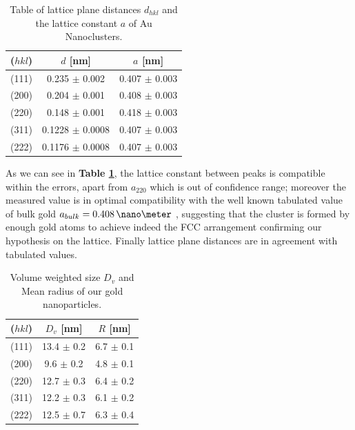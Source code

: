 \documentclass[twocolumn]{article}
\begin{document}
\begin{multicols}{2}
\begin{table}[H]
    \centering
    \begin{tabular}{c c c}
         ($hkl$) & {\bf $d$} [nm] & {\bf $a$} [nm] \\
        \hline
        \hline
         (111) & 0.235 $\pm$ 0.002 & 0.407 $\pm$ 0.003  \\
         (200) & 0.204 $\pm$ 0.001 & 0.408 $\pm$ 0.003  \\
         (220) & 0.148 $\pm$ 0.001 & 0.418 $\pm$ 0.003 \\
         (311) & 0.1228 $\pm$ 0.0008 & 0.407 $\pm$ 0.003 \\
         (222) & 0.1176 $\pm$ 0.0008 & 0.407 $\pm$ 0.003 \\
         \hline
    \end{tabular}
    \caption{Table of lattice plane distances $d_{hkl}$ and the lattice constant $a$ of Au Nanoclusters.}
    \label{tab:latticeconst}
\end{table}
As we can see in {\bf Table \ref{tab:latticeconst}}, the lattice constant between peaks is compatible within the errors, apart from $a_{220}$ which is out of confidence range; moreover the measured value is in optimal compatibility with the well known tabulated value of bulk gold $a_{bulk} = 0.408\, \nano\meter$ \cite{Kittel2004}, suggesting that the cluster is formed by enough gold atoms to achieve indeed the FCC arrangement confirming our hypothesis on the lattice.
Finally lattice plane distances are in agreement with tabulated values.

\begin{table}[H]
    \centering
    \begin{tabular}{c c c}
         ($hkl$) & {\bf $D_v$} [nm] & {\bf $R$} [nm] \\
        \hline
        \hline
         (111) & 13.4 $\pm$ 0.2 & 6.7 $\pm$ 0.1 \\
         (200) & 9.6 $\pm$ 0.2 & 4.8 $\pm$ 0.1 \\
         (220) & 12.7 $\pm$ 0.3 & 6.4 $\pm$ 0.2 \\
         (311) & 12.2 $\pm$ 0.3 & 6.1 $\pm$ 0.2 \\
         (222) & 12.5 $\pm$ 0.7 & 6.3 $\pm$ 0.4 \\
         \hline
    \end{tabular}
    \caption{Volume weighted size $D_v$ and Mean radius of our gold nanoparticles.}
    \label{}
\end{table}


\end{multicols}
\end{document}
